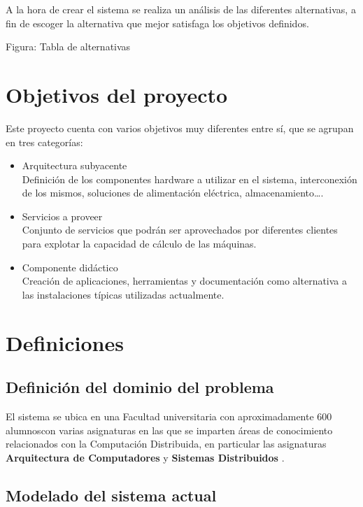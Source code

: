 A la hora de crear el sistema se realiza un análisis de las diferentes alternativas, a fin de escoger la alternativa que mejor satisfaga los objetivos definidos.

Figura: Tabla de alternativas

\section{Objetivos del proyecto}

Este proyecto cuenta con varios objetivos muy diferentes entre sí, que se agrupan en tres categorías:
\begin{itemize}
  \item Arquitectura subyacente\\
  Definición de los componentes hardware a utilizar en el sistema, interconexión de los mismos, soluciones de alimentación eléctrica, almacenamiento\dots.
  \item Servicios a proveer\\
  Conjunto de servicios que podrán ser aprovechados por diferentes clientes para explotar la capacidad de cálculo de las máquinas.
  \item Componente didáctico\\
  Creación de aplicaciones, herramientas y documentación como alternativa a las instalaciones típicas utilizadas actualmente.
\end{itemize}

\section{Definiciones}

\subsection{Definición del dominio del problema}

El sistema se ubica en una Facultad universitaria con aproximadamente 600 alumnos\citationneeded con varias asignaturas en las que se imparten áreas de conocimiento relacionados con la Computación Distribuida, en particular las asignaturas \textbf{Arquitectura de Computadores} y \textbf{Sistemas Distribuidos} \cite{DIA15GuiaAcademica}.

\subsection{Modelado del sistema actual}

